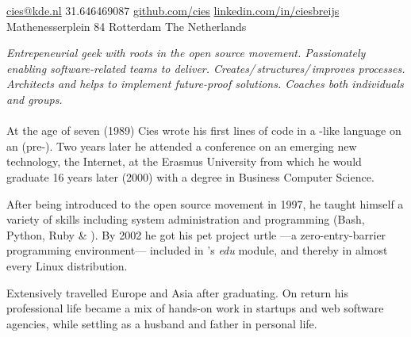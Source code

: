 \documentclass[10pt,a4paper]{article}
\begin{document}
\sloppy  %



\nobreakvspace{0.3em}  %

\noindent\href{mailto:cies.at.kde.dot.nl}{cies\mbox{}@\mbox{}kde.nl}\sbull
\textsmaller{+}31.646469087\sbull
\href{https://github.com/cies}{github.com/cies}\sbull
\href{http://linkedin.com/in/ciesbreijs}{linkedin.com/in/ciesbreijs}
\\
Mathenesserplein 84\sbull
Rotterdam\sbull
The Netherlands

\spacedhrule{0.9em}{-0.4em}  %


\vspace{-1.3em}  %
\begin{multicols}{2}  %
\noindent \emph{Entrepeneurial geek with roots in the open source movement. Passionately enabling software-related teams to deliver. Creates/\,structures/\,improves processes. Architects and helps to implement future-proof solutions. Coaches both individuals and groups.}
\\
\\
At the age of seven (1989) Cies wrote his first lines of code in a -like language on an  (pre-).  Two years later he attended a conference on an emerging new technology, the Internet, at the Erasmus University from which he would graduate 16 years later (2000) with a degree in Business Computer Science.

After being introduced to the open source movement in 1997, he taught himself a variety of skills including system administration and programming (Bash, Python, Ruby \& \CPP).  By 2002 he got his pet project urtle ---a zero-entry-barrier programming environment--- included in 's \emph{edu} module, and thereby in almost every Linux distribution.

Extensively travelled Europe and Asia after graduating. On return his professional life became a mix of hands-on work in startups and web software agencies, while settling as a husband and father in personal life.
\end{multicols}
\end{document}
